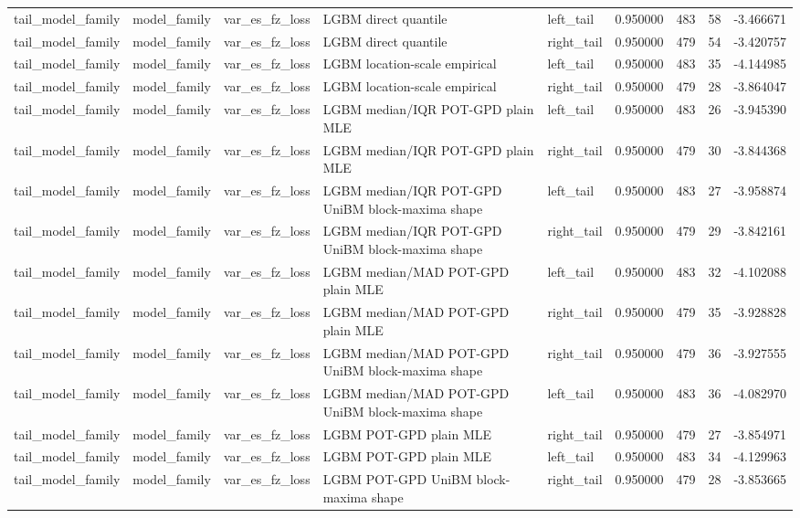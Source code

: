 \begin{tabular}{lllllrrr}
tail\_model\_family & model\_family & var\_es\_fz\_loss & LGBM direct quantile & left\_tail & 0.950000 & 483 & 58 & -3.466671 \\
tail\_model\_family & model\_family & var\_es\_fz\_loss & LGBM direct quantile & right\_tail & 0.950000 & 479 & 54 & -3.420757 \\
tail\_model\_family & model\_family & var\_es\_fz\_loss & LGBM location-scale empirical & left\_tail & 0.950000 & 483 & 35 & -4.144985 \\
tail\_model\_family & model\_family & var\_es\_fz\_loss & LGBM location-scale empirical & right\_tail & 0.950000 & 479 & 28 & -3.864047 \\
tail\_model\_family & model\_family & var\_es\_fz\_loss & LGBM median/IQR POT-GPD plain MLE & left\_tail & 0.950000 & 483 & 26 & -3.945390 \\
tail\_model\_family & model\_family & var\_es\_fz\_loss & LGBM median/IQR POT-GPD plain MLE & right\_tail & 0.950000 & 479 & 30 & -3.844368 \\
tail\_model\_family & model\_family & var\_es\_fz\_loss & LGBM median/IQR POT-GPD UniBM block-maxima shape & left\_tail & 0.950000 & 483 & 27 & -3.958874 \\
tail\_model\_family & model\_family & var\_es\_fz\_loss & LGBM median/IQR POT-GPD UniBM block-maxima shape & right\_tail & 0.950000 & 479 & 29 & -3.842161 \\
tail\_model\_family & model\_family & var\_es\_fz\_loss & LGBM median/MAD POT-GPD plain MLE & left\_tail & 0.950000 & 483 & 32 & -4.102088 \\
tail\_model\_family & model\_family & var\_es\_fz\_loss & LGBM median/MAD POT-GPD plain MLE & right\_tail & 0.950000 & 479 & 35 & -3.928828 \\
tail\_model\_family & model\_family & var\_es\_fz\_loss & LGBM median/MAD POT-GPD UniBM block-maxima shape & right\_tail & 0.950000 & 479 & 36 & -3.927555 \\
tail\_model\_family & model\_family & var\_es\_fz\_loss & LGBM median/MAD POT-GPD UniBM block-maxima shape & left\_tail & 0.950000 & 483 & 36 & -4.082970 \\
tail\_model\_family & model\_family & var\_es\_fz\_loss & LGBM POT-GPD plain MLE & right\_tail & 0.950000 & 479 & 27 & -3.854971 \\
tail\_model\_family & model\_family & var\_es\_fz\_loss & LGBM POT-GPD plain MLE & left\_tail & 0.950000 & 483 & 34 & -4.129963 \\
tail\_model\_family & model\_family & var\_es\_fz\_loss & LGBM POT-GPD UniBM block-maxima shape & right\_tail & 0.950000 & 479 & 28 & -3.853665 \\

\end{tabular}
